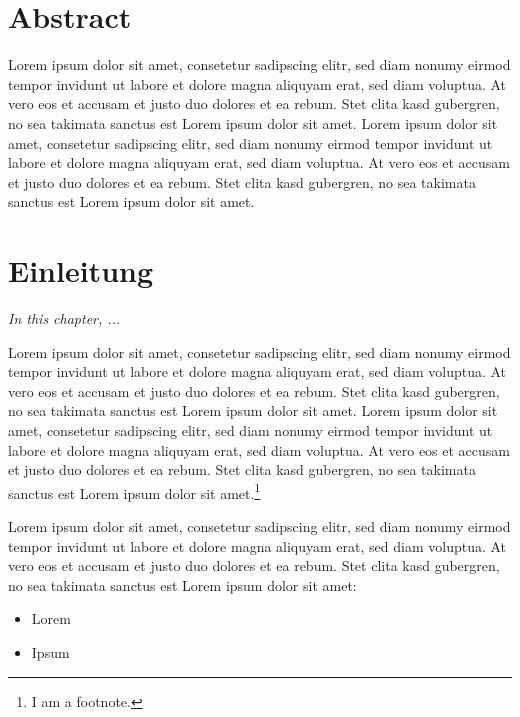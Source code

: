 \documentclass[
	12pt,
	a4paper,
	BCOR10mm,
	DIV14,
	headsepline,
	usegeometry,
]{scrreprt}
\begin{document}
\restoregeometry

\chapter*{Abstract}

\thispagestyle{empty}

Lorem ipsum dolor sit amet, consetetur sadipscing elitr, sed diam nonumy eirmod tempor invidunt ut labore et dolore magna aliquyam erat, sed diam voluptua.
At vero eos et accusam et justo duo dolores et ea rebum.
Stet clita kasd gubergren, no sea takimata sanctus est Lorem ipsum dolor sit amet.
Lorem ipsum dolor sit amet, consetetur sadipscing elitr, sed diam nonumy eirmod tempor invidunt ut labore et dolore magna aliquyam erat, sed diam voluptua.
At vero eos et accusam et justo duo dolores et ea rebum.
Stet clita kasd gubergren, no sea takimata sanctus est Lorem ipsum dolor sit amet.

\tableofcontents

\chapter{Einleitung}
\label{Einleitung}

\textit{%
In this chapter, ...
}

\bigskip

Lorem ipsum dolor sit amet, consetetur sadipscing elitr, sed diam nonumy eirmod tempor invidunt ut labore et dolore magna aliquyam erat, sed diam voluptua.
At vero eos et accusam et justo duo dolores et ea rebum.
Stet clita kasd gubergren, no sea takimata sanctus est Lorem ipsum dolor sit amet.
Lorem ipsum dolor sit amet, consetetur sadipscing elitr, sed diam nonumy eirmod tempor invidunt ut labore et dolore magna aliquyam erat, sed diam voluptua.
At vero eos et accusam et justo duo dolores et ea rebum.
Stet clita kasd gubergren, no sea takimata sanctus est Lorem ipsum dolor sit amet.\footnote{I am a footnote.}

Lorem ipsum dolor sit amet, consetetur sadipscing elitr, sed diam nonumy eirmod tempor invidunt ut labore et dolore magna aliquyam erat, sed diam voluptua.
At vero eos et accusam et justo duo dolores et ea rebum.
Stet clita kasd gubergren, no sea takimata sanctus est Lorem ipsum dolor sit amet:

\begin{itemize}
	\item Lorem
	\item Ipsum
\end{itemize}
\end{document}
